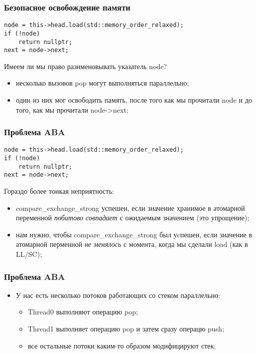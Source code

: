 \begin{frame}[fragile]
\frametitle{Безопасное освобождение памяти}

\begin{lstlisting}
node = this->head.load(std::memory_order_relaxed);
if (!node)
    return nullptr;
next = node->next;
\end{lstlisting}
Имеем ли мы право разименовывать указатель node?
\begin{itemize}
  \item несколько вызовов pop могут выполняться параллельно;
  \item один из них мог освободить память, после того как мы прочитали node и до того, как мы прочитали node->next;
\end{itemize}
\end{frame}

\begin{frame}[fragile]
\frametitle{Проблема ABA}
\begin{lstlisting}
node = this->head.load(std::memory_order_relaxed);
if (!node)
    return nullptr;
next = node->next;
\end{lstlisting}
Гораздо более тонкая неприятность:
\begin{itemize}
  \item<1-> compare\_exchange\_strong успешен, если значение хранимое в атомарной переменной \emph{побитово совпадает} с ожидаемым значением (это упрощение);
  \item<2-> нам нужно, чтобы compare\_exchange\_strong был уcпешен, если значение в атомарной перменной \emph{не менялось} с момента, когда мы сделали load (как в LL/SC);
\end{itemize}
\end{frame}

\begin{frame}
\frametitle{Проблема ABA}

\begin{itemize}
  \item У нас есть несколько потоков работающих со стеком параллельно:
    \begin{itemize}
      \item Thread0 выполняют операцию pop;
      \item Thread1 выполняет операцию pop и затем сразу операцю push;
      \item все остальные потоки каким-то образом модифицируют стек;
    \end{itemize}
\end{itemize}
\end{frame}

